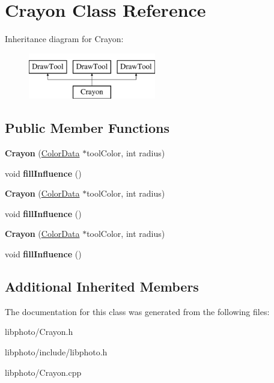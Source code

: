 \hypertarget{classCrayon}{\section{Crayon Class Reference}
\label{classCrayon}
}
Inheritance diagram for Crayon\-:\begin{figure}[H]
\begin{center}
\leavevmode
\includegraphics[height=2.000000cm]{classCrayon}
\end{center}
\end{figure}
\subsection*{Public Member Functions}
\begin{DoxyCompactItemize}
\item 
\hypertarget{classCrayon_a705e3468d3ede98a95f792bfd05be7dd}{{\bfseries Crayon} (\hyperlink{classColorData}{Color\-Data} $\ast$tool\-Color, int radius)}\label{classCrayon_a705e3468d3ede98a95f792bfd05be7dd}

\item 
\hypertarget{classCrayon_a2af3bd14c6bc719a252a9c9f1c5eccb7}{void {\bfseries fill\-Influence} ()}\label{classCrayon_a2af3bd14c6bc719a252a9c9f1c5eccb7}

\item 
\hypertarget{classCrayon_a705e3468d3ede98a95f792bfd05be7dd}{{\bfseries Crayon} (\hyperlink{classColorData}{Color\-Data} $\ast$tool\-Color, int radius)}\label{classCrayon_a705e3468d3ede98a95f792bfd05be7dd}

\item 
\hypertarget{classCrayon_a2af3bd14c6bc719a252a9c9f1c5eccb7}{void {\bfseries fill\-Influence} ()}\label{classCrayon_a2af3bd14c6bc719a252a9c9f1c5eccb7}

\item 
\hypertarget{classCrayon_a705e3468d3ede98a95f792bfd05be7dd}{{\bfseries Crayon} (\hyperlink{classColorData}{Color\-Data} $\ast$tool\-Color, int radius)}\label{classCrayon_a705e3468d3ede98a95f792bfd05be7dd}

\item 
\hypertarget{classCrayon_a2af3bd14c6bc719a252a9c9f1c5eccb7}{void {\bfseries fill\-Influence} ()}\label{classCrayon_a2af3bd14c6bc719a252a9c9f1c5eccb7}

\end{DoxyCompactItemize}
\subsection*{Additional Inherited Members}


The documentation for this class was generated from the following files\-:\begin{DoxyCompactItemize}
\item 
libphoto/Crayon.\-h\item 
libphoto/include/libphoto.\-h\item 
libphoto/Crayon.\-cpp\end{DoxyCompactItemize}
